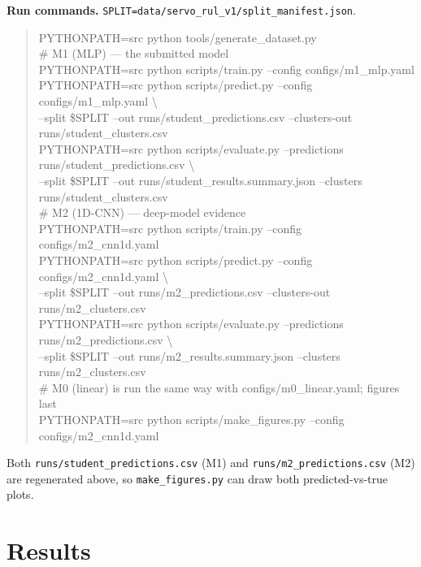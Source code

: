 \documentclass[11pt,a4paper]{article}
\newcommand{\code}[1]{\texttt{\small #1}}
\begin{document}
\textbf{Run commands.} \code{SPLIT=data/servo\_rul\_v1/split\_manifest.json}.
\begin{quote}\scriptsize\ttfamily
PYTHONPATH=src python tools/generate\_dataset.py\\[0.3em]
\# M1 (MLP) --- the submitted model\\
PYTHONPATH=src python scripts/train.py --config configs/m1\_mlp.yaml\\
PYTHONPATH=src python scripts/predict.py --config configs/m1\_mlp.yaml \textbackslash\\
\hspace*{1em}--split \$SPLIT --out runs/student\_predictions.csv --clusters-out runs/student\_clusters.csv\\
PYTHONPATH=src python scripts/evaluate.py --predictions runs/student\_predictions.csv \textbackslash\\
\hspace*{1em}--split \$SPLIT --out runs/student\_results.summary.json --clusters runs/student\_clusters.csv\\[0.3em]
\# M2 (1D-CNN) --- deep-model evidence\\
PYTHONPATH=src python scripts/train.py --config configs/m2\_cnn1d.yaml\\
PYTHONPATH=src python scripts/predict.py --config configs/m2\_cnn1d.yaml \textbackslash\\
\hspace*{1em}--split \$SPLIT --out runs/m2\_predictions.csv --clusters-out runs/m2\_clusters.csv\\
PYTHONPATH=src python scripts/evaluate.py --predictions runs/m2\_predictions.csv \textbackslash\\
\hspace*{1em}--split \$SPLIT --out runs/m2\_results.summary.json --clusters runs/m2\_clusters.csv\\[0.3em]
\# M0 (linear) is run the same way with configs/m0\_linear.yaml; figures last\\
PYTHONPATH=src python scripts/make\_figures.py --config configs/m2\_cnn1d.yaml
\end{quote}
Both \code{runs/student\_predictions.csv} (M1) and \code{runs/m2\_predictions.csv}
(M2) are regenerated above, so \code{make\_figures.py} can draw both
predicted-vs-true plots.

\section{Results}\label{sec:results}
\end{document}
